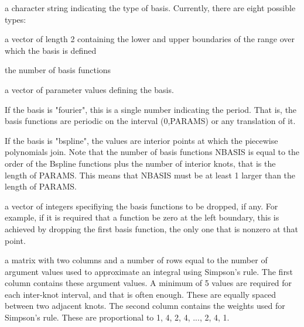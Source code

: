 \begin{Arguments}
\begin{ldescription}
\item[\code{type}] a character string indicating the type of basis.  Currently,
there are eight possible types:


\item[\code{rangeval}] a vector of length 2 containing the lower and upper boundaries
of the range over which the basis is defined

\item[\code{nbasis}] the number of basis functions

\item[\code{params}] a vector of parameter values defining the basis.

If the basis is "fourier", this is a single number indicating the
period.  That is, the basis functions are periodic on the interval
(0,PARAMS) or any translation of it.

If the basis is "bspline", the values are interior points at which
the piecewise polynomials join.  Note that the number of basis
functions NBASIS is equal to the order of the Bspline functions plus
the number of interior knots, that is the length of PARAMS.  This
means that NBASIS must be at least 1 larger than the length of PARAMS.

\item[\code{dropind}] a vector of integers specifiying the basis functions to
be dropped, if any.  For example, if it is required that
a function be zero at the left boundary, this is achieved
by dropping the first basis function, the only one that
is nonzero at that point.

\item[\code{quadvals}] a matrix with two columns and a number of rows equal to the number
of argument values used to approximate an integral using Simpson's
rule.  The first column contains these argument values.  A minimum
of 5 values are required for each inter-knot interval, and that is
often enough. These are equally spaced between two adjacent knots.
The second column contains the weights used for Simpson's rule.
These are proportional to 1, 4, 2, 4, ..., 2, 4, 1.


\end{ldescription}
\end{Arguments}
